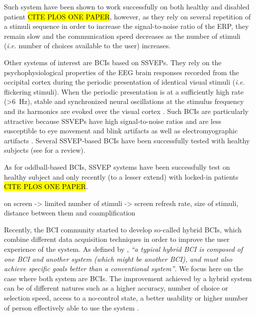\documentclass[10pt]{article}
\begin{document}
Such system have been shown to work successfully on both healthy and disabled patient \cite{Sellers2010, Krusienski2008} \hl{CITE PLOS ONE PAPER}, however, as they rely on several repetition of a stimuli sequence in order to increase the signal-to-noise ratio of the \ac{ERP}, they remain slow and the communication speed decreases as the number of stimuli (\emph{i.e.} number of choices available to the user) increases.

Other systems of interest are \acp{BCI} based on \acp{SSVEP}.
They rely on the psychophysiological properties of the EEG brain responses recorded from the occipital cortex during the periodic presentation of identical visual stimuli (\emph{i.e.} flickering stimuli).
When the periodic presentation is at a sufficiently high rate (\SI{>6}{\Hz}), stable and synchronized neural oscillations at the stimulus frequency and its harmonics are evoked over the visual cortex \parencite{Regan1966, Herrmann2001, Luck2005}.
Such \acp{BCI} are particularly attractive because \acp{SSVEP} have high signal-to-noise ratios and are less susceptible to eye movement and blink artifacts \parencite{Perlstein2003} as well as electromyographic artifacts \parencite{Gray2003}.
Several \ac{SSVEP}-based \acp{BCI} have been successfully tested with healthy subjects (see \cite{Vialatte2010} for a review).

As for oddball-based \acp{BCI}, \ac{SSVEP} systems have been successfully test on healthy subject \parencite{Friman.2007, Allison2008} and only recently (to a lesser extend) with locked-in patients \parencite{Parini2009} \hl{CITE PLOS ONE PAPER}.


on screen -> limited number of stimuli -> screen refresh rate, size of stimuli, distance between them and coamplification


Recently, the \ac{BCI} community started to develop so-called hybrid \acp{BCI}, which combine different data acquisition techniques in order to improve the user experience of the system.
As defined by \cite{Pfurtscheller2010}, \emph{``a typical hybrid BCI is composed of one BCI and another system (which might be another BCI), and must also achieve specific goals better than a conventional system''}.
We focus here on the case where both system are \acp{BCI}.
The improvement achieved by a hybrid system can be of different natures such as a higher accuracy, number of choice or selection speed, access to a no-control state, a better usability or higher number of person effectively able to use the system \parencite{Brunner2011}.
\end{document}
